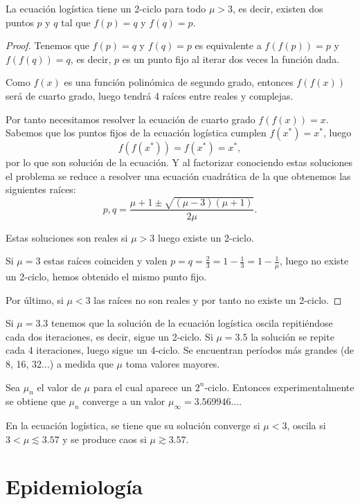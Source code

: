 \begin{proposition}
La ecuación logística tiene un 2-ciclo para todo $\mu > 3$, es decir, existen dos puntos $p$ y $q$ tal que $f(p)=q$ y $f(q)=p$.
\end{proposition}

\begin{proof}
Tenemos que $f(p)=q$ y $f(q)=p$ es equivalente a $f(f(p))=p$ y $f(f(q))=q$, es decir, $p$ es un punto fijo al iterar dos veces la función dada.

Como $f(x)$ es una función polinómica de segundo grado, entonces $f(f(x))$ será de cuarto grado, luego tendrá 4 raíces entre reales y complejas.

Por tanto necesitamos resolver la ecuación de cuarto grado $f(f(x))=x$. Sabemos que los puntos fijos de la ecuación logística cumplen $f(x^*)=x^*$, luego
$$f(f(x^*))=f(x^*)=x^*,$$
por lo que son solución de la ecuación. Y al factorizar conociendo estas soluciones el problema se reduce a resolver una ecuación cuadrática de la que obtenemos las siguientes raíces:
$$p,q=\frac{\mu+1\pm \sqrt{(\mu -3)(\mu +1)}}{2\mu}.$$

Estas soluciones son reales si $\mu > 3$ luego existe un 2-ciclo.

Si $\mu = 3$ estas raíces coinciden y valen $p=q=\frac{2}{3}=1-\frac{1}{3}=1-\frac{1}{\mu }$, luego no existe un 2-ciclo, hemos obtenido el mismo punto fijo.

Por último, si $\mu < 3$ las raíces no son reales y por tanto no existe un 2-ciclo.
\end{proof}

Si $\mu = 3.3$ tenemos  que la solución de la ecuación logística oscila repitiéndose cada dos iteraciones, es decir, sigue un 2-ciclo. Si $\mu = 3.5$ la solución se repite cada 4 iteraciones, luego sigue un 4-ciclo.
Se encuentran períodos más grandes (de 8, 16, 32...) a medida que $\mu$ toma valores mayores.

Sea $\mu_n$ el valor de $\mu$ para el cual aparece un $2^n$-ciclo. Entonces experimentalmente se obtiene que $\mu_n$ converge a un valor $\mu_\infty=3.569946...$.


\begin{proposition}
En la ecuación logística, se tiene que su solución converge si $\mu < 3$, oscila si $3 < \mu \lesssim 3.57$ y se produce caos si $\mu \gtrsim 3.57$. 
\end{proposition}


\section{Epidemiología}

